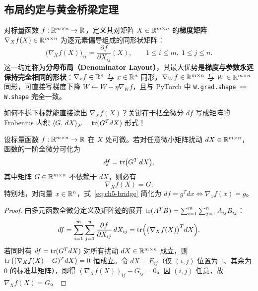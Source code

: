 \subsection{布局约定与黄金桥梁定理}

\begin{defBox}
\begin{definition}[矩阵梯度与分母布局约定]\label{def:ch5-denom-layout}
对标量函数 $f:\mathbb{R}^{m\times n}\to\mathbb{R}$，定义其对矩阵 $X\in\mathbb{R}^{m\times n}$ 的\textbf{梯度矩阵} $\nabla_X f(X) \in \mathbb{R}^{m\times n}$ 为逐元素偏导组成的同形状矩阵：
\[
  \big(\nabla_X f(X)\big)_{ij} \coloneqq \frac{\partial f}{\partial X_{ij}}(X),
  \qquad 1\le i\le m,\; 1\le j\le n.
\]
这一约定称为\textbf{分母布局（Denominator Layout）}，其最大优势是\textbf{梯度与参数永远保持完全相同的形状}：$\nabla_x f \in \mathbb{R}^n$ 与 $x\in\mathbb{R}^n$ 同形，$\nabla_W f \in \mathbb{R}^{m\times n}$ 与 $W\in\mathbb{R}^{m\times n}$ 同形，可直接写梯度下降 $W \leftarrow W - \eta \nabla_W f$，且与 PyTorch 中 \texttt{W.grad.shape == W.shape} 完全一致。
\end{definition}
\end{defBox}

如何不拆下标就能直接读出 $\nabla_X f(X)$？关键在于把全微分 $df$ 写成矩阵的 Frobenius 内积 $\left\langle G,\, dX \right\rangle_F = \operatorname{tr}(G^T dX)$ 形式！

\begin{thmBox}
\begin{theorem}\label{thm:ch5-golden-bridge}
设标量函数 $f:\mathbb{R}^{m\times n}\to\mathbb{R}$ 在 $X$ 处可微。若对任意微小矩阵扰动 $dX\in\mathbb{R}^{m\times n}$，函数的一阶全微分可化为
\begin{equation}\label{eq:ch5-bridge}
  df = \operatorname{tr}\!\big(G^T\, dX\big),
\end{equation}
其中矩阵 $G\in\mathbb{R}^{m\times n}$ 不依赖于 $dX$，则必有
\[
  \nabla_X f(X) = G.
\]
特别地，对向量 $x\in\mathbb{R}^n$，式~\eqref{eq:ch5-bridge} 简化为 $df = g^T dx \iff \nabla_x f(x) = g$。
\end{theorem}
\end{thmBox}

\begin{proof}
由多元函数全微分定义及矩阵迹的展开 $\operatorname{tr}(A^T B) = \sum_{i=1}^m\sum_{j=1}^n A_{ij} B_{ij}$：
\[
  df = \sum_{i=1}^m \sum_{j=1}^n \frac{\partial f}{\partial X_{ij}}\, dX_{ij}
     = \operatorname{tr}\!\Big(\big(\nabla_X f(X)\big)^T dX\Big).
\]
若同时有 $df = \operatorname{tr}(G^T dX)$ 对所有扰动 $dX\in\mathbb{R}^{m\times n}$ 成立，则 $\operatorname{tr}\big((\nabla_X f(X) - G)^T dX\big) = 0$ 恒成立。令 $dX = E_{ij}$（仅 $(i,j)$ 位置为 $1$、其余为 $0$ 的标准基矩阵），即得 $(\nabla_X f(X))_{ij} - G_{ij} = 0$。因 $(i,j)$ 任意，故 $\nabla_X f(X) = G$。
\end{proof}

